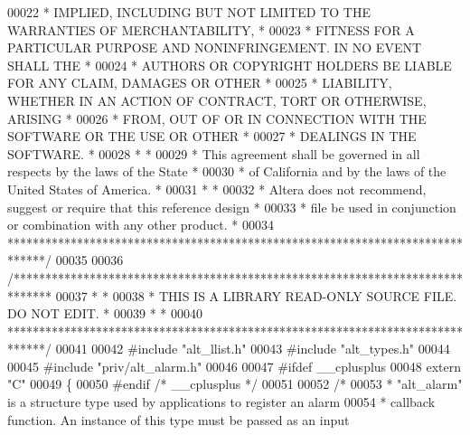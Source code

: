 \begin{DoxyCode}
00022 \textcolor{comment}{* IMPLIED, INCLUDING BUT NOT LIMITED TO THE WARRANTIES OF MERCHANTABILITY,    *}
00023 \textcolor{comment}{* FITNESS FOR A PARTICULAR PURPOSE AND NONINFRINGEMENT. IN NO EVENT SHALL THE *}
00024 \textcolor{comment}{* AUTHORS OR COPYRIGHT HOLDERS BE LIABLE FOR ANY CLAIM, DAMAGES OR OTHER      *}
00025 \textcolor{comment}{* LIABILITY, WHETHER IN AN ACTION OF CONTRACT, TORT OR OTHERWISE, ARISING     *}
00026 \textcolor{comment}{* FROM, OUT OF OR IN CONNECTION WITH THE SOFTWARE OR THE USE OR OTHER         *}
00027 \textcolor{comment}{* DEALINGS IN THE SOFTWARE.                                                   *}
00028 \textcolor{comment}{*                                                                             *}
00029 \textcolor{comment}{* This agreement shall be governed in all respects by the laws of the State   *}
00030 \textcolor{comment}{* of California and by the laws of the United States of America.              *}
00031 \textcolor{comment}{*                                                                             *}
00032 \textcolor{comment}{* Altera does not recommend, suggest or require that this reference design    *}
00033 \textcolor{comment}{* file be used in conjunction or combination with any other product.          *}
00034 \textcolor{comment}{******************************************************************************/}
00035 
00036 \textcolor{comment}{/******************************************************************************}
00037 \textcolor{comment}{*                                                                             *}
00038 \textcolor{comment}{* THIS IS A LIBRARY READ-ONLY SOURCE FILE. DO NOT EDIT.                       *}
00039 \textcolor{comment}{*                                                                             *}
00040 \textcolor{comment}{******************************************************************************/}
00041 
00042 \textcolor{preprocessor}{#include "alt_llist.h"}
00043 \textcolor{preprocessor}{#include "alt_types.h"}
00044 
00045 \textcolor{preprocessor}{#include "priv/alt_alarm.h"}
00046 
00047 \textcolor{preprocessor}{#ifdef \_\_cplusplus}
00048 \textcolor{keyword}{extern} \textcolor{stringliteral}{"C"}
00049 \{
00050 \textcolor{preprocessor}{#endif }\textcolor{comment}{/* \_\_cplusplus */}\textcolor{preprocessor}{}
00051 
00052 \textcolor{comment}{/*}
00053 \textcolor{comment}{ * "alt\_alarm" is a structure type used by applications to register an alarm}
00054 \textcolor{comment}{ * callback function. An instance of this type must be passed as an input}

\end{DoxyCode}
